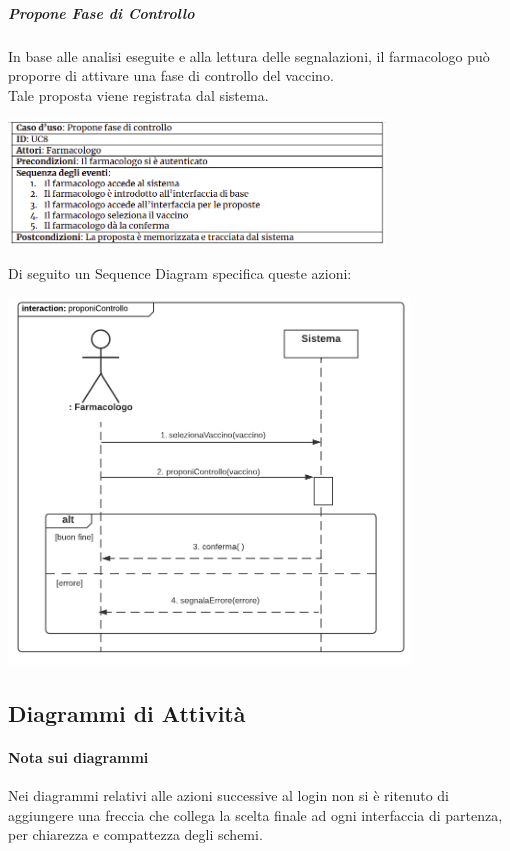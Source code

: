\documentclass{article}
\begin{document}
\newpage
    \subparagraph*{Propone Fase di Controllo}
        In base alle analisi eseguite e alla lettura delle segnalazioni, il farmacologo può proporre di attivare una fase di controllo del vaccino.\\
        Tale proposta viene registrata dal sistema.
            \begin{center}
                \includegraphics[width=0.75\textwidth]{pictures/UC8.png}
            \end{center}
        Di seguito un Sequence Diagram specifica queste azioni:
            \begin{center}
                \includegraphics[width=0.80\textwidth]{pictures/SDFarmacolo2_proponeControllo.png}
            \end{center}

\newpage
    \subsection{Diagrammi di Attività}
        \paragraph*{Nota sui diagrammi}
        Nei diagrammi relativi alle azioni successive al login non si è ritenuto di aggiungere una freccia che collega la scelta finale ad ogni interfaccia di partenza, per chiarezza e compattezza degli schemi.\\
\end{document}
